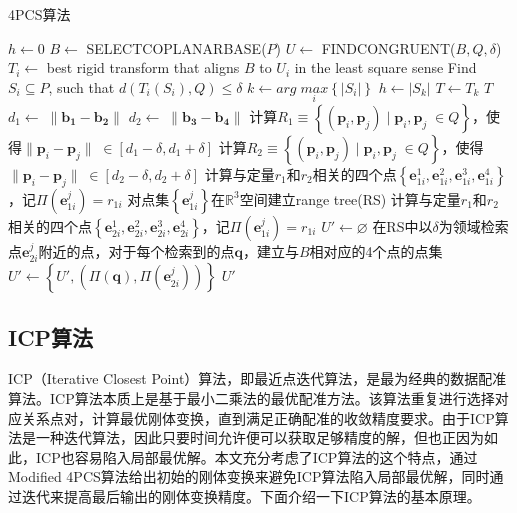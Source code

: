 \begin{algorithm}
  \caption{4PCS算法}
  \label{alg:4pcs}
  $h\leftarrow 0$\;
   {
    $B\leftarrow$ SELECTCOPLANARBASE($P$)\;
    $U\leftarrow$ FINDCONGRUENT($B,Q,\delta$)\;
     {
      $T_i\leftarrow$ best rigid transform that aligns $B$ to $U_i$ in the least square sense\;
      Find $S_i\subseteq P$, such that $d(T_i(S_i), Q)\leq\delta$\;
    }
    $k\leftarrow arg\;\underset{i}{max}\left\{|S_i|\right\}$\;
     {
      $h\leftarrow |S_k|$\;
      $T\leftarrow T_k$\;
    }
    \Return $T$\;
  }
  \BlankLine
  \BlankLine
  \BlankLine
  \BlankLine
   {
    $d_1\leftarrow\;\parallel\mathbf{b_1}-\mathbf{b_2}\parallel$\;
    $d_2\leftarrow\;\parallel\mathbf{b_3}-\mathbf{b_4}\parallel$\;
    计算$R_1\equiv\left\{(\mathbf{p}_i,\mathbf{p}_j)\;|\;\mathbf{p}_i,\mathbf{p}_j\;\in Q\right\}$，使得$\parallel\mathbf{p}_i-\mathbf{p}_j\parallel\;\in [d_1-\delta,d_1+\delta]$\;
    计算$R_2\equiv\left\{(\mathbf{p}_i,\mathbf{p}_j)\;|\;\mathbf{p}_i,\mathbf{p}_j\;\in Q\right\}$，使得$\parallel\mathbf{p}_i-\mathbf{p}_j\parallel\;\in [d_2-\delta,d_2+\delta]$\;
     {
      计算与定量$r_1$和$r_2$相关的四个点$\left\{\mathbf{e}_{1i}^1,\mathbf{e}_{1i}^2,\mathbf{e}_{1i}^3,\mathbf{e}_{1i}^4\right\}$，记$\Pi(\mathbf{e}_{1i}^j)=r_{1i}$\;
    }
    对点集$\left\{\mathbf{e}_{1i}^j\right\}$在$\mathbb{R}^3$空间建立range tree(RS)\;
     {
      计算与定量$r_1$和$r_2$相关的四个点$\left\{\mathbf{e}_{2i}^1,\mathbf{e}_{2i}^2,\mathbf{e}_{2i}^3,\mathbf{e}_{2i}^4\right\}$，记$\Pi(\mathbf{e}_{1i}^j)=r_{1i}$\;
    }
    $U'\leftarrow\varnothing$\;
     {
      在RS中以$\delta$为领域检索点$\mathbf{e}_{2i}^j$附近的点，对于每个检索到的点$\mathbf{q}$，建立与$B$相对应的4个点的点集$U'\leftarrow\left\{U',(\Pi(\mathbf{q}),\Pi(\mathbf{e}_{2i}^j))\right\}$\;
    }
    \Return $U'$\;
  }
\end{algorithm}

\subsection{ICP算法}
ICP（Iterative Closest Point）算法，即最近点迭代算法，是最为经典的数据配准算法。ICP算法本质上是基于最小二乘法的最优配准方法。该算法重复进行选择对应关系点对，计算最优刚体变换，直到满足正确配准的收敛精度要求。由于ICP算法是一种迭代算法，因此只要时间允许便可以获取足够精度的解，但也正因为如此，ICP也容易陷入局部最优解。本文充分考虑了ICP算法的这个特点，通过Modified 4PCS算法给出初始的刚体变换来避免ICP算法陷入局部最优解，同时通过迭代来提高最后输出的刚体变换精度。下面介绍一下ICP算法的基本原理。

